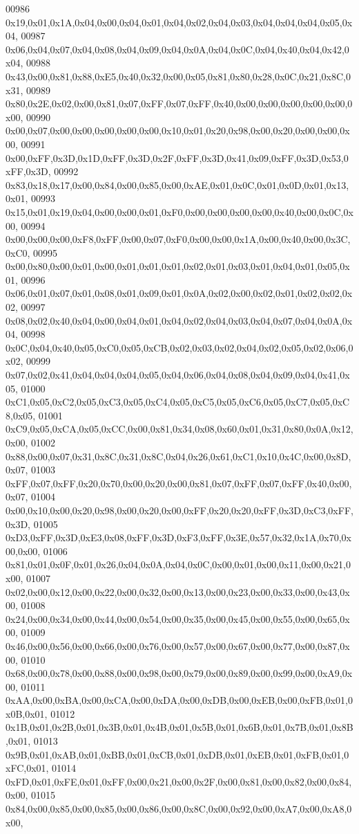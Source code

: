 \begin{DoxyCode}
00986 0x19,0x01,0x1A,0x04,0x00,0x04,0x01,0x04,0x02,0x04,0x03,0x04,0x04,0x04,0x05,0x04,
00987 0x06,0x04,0x07,0x04,0x08,0x04,0x09,0x04,0x0A,0x04,0x0C,0x04,0x40,0x04,0x42,0x04,
00988 0x43,0x00,0x81,0x88,0xE5,0x40,0x32,0x00,0x05,0x81,0x80,0x28,0x0C,0x21,0x8C,0x31,
00989 0x80,0x2E,0x02,0x00,0x81,0x07,0xFF,0x07,0xFF,0x40,0x00,0x00,0x00,0x00,0x00,0x00,
00990 0x00,0x07,0x00,0x00,0x00,0x00,0x00,0x10,0x01,0x20,0x98,0x00,0x20,0x00,0x00,0x00,
00991 0x00,0xFF,0x3D,0x1D,0xFF,0x3D,0x2F,0xFF,0x3D,0x41,0x09,0xFF,0x3D,0x53,0xFF,0x3D,
00992 0x83,0x18,0x17,0x00,0x84,0x00,0x85,0x00,0xAE,0x01,0x0C,0x01,0x0D,0x01,0x13,0x01,
00993 0x15,0x01,0x19,0x04,0x00,0x00,0x01,0xF0,0x00,0x00,0x00,0x00,0x40,0x00,0x0C,0x00,
00994 0x00,0x00,0x00,0xF8,0xFF,0x00,0x07,0xF0,0x00,0x00,0x1A,0x00,0x40,0x00,0x3C,0xC0,
00995 0x00,0x80,0x00,0x01,0x00,0x01,0x01,0x01,0x02,0x01,0x03,0x01,0x04,0x01,0x05,0x01,
00996 0x06,0x01,0x07,0x01,0x08,0x01,0x09,0x01,0x0A,0x02,0x00,0x02,0x01,0x02,0x02,0x02,
00997 0x08,0x02,0x40,0x04,0x00,0x04,0x01,0x04,0x02,0x04,0x03,0x04,0x07,0x04,0x0A,0x04,
00998 0x0C,0x04,0x40,0x05,0xC0,0x05,0xCB,0x02,0x03,0x02,0x04,0x02,0x05,0x02,0x06,0x02,
00999 0x07,0x02,0x41,0x04,0x04,0x04,0x05,0x04,0x06,0x04,0x08,0x04,0x09,0x04,0x41,0x05,
01000 0xC1,0x05,0xC2,0x05,0xC3,0x05,0xC4,0x05,0xC5,0x05,0xC6,0x05,0xC7,0x05,0xC8,0x05,
01001 0xC9,0x05,0xCA,0x05,0xCC,0x00,0x81,0x34,0x08,0x60,0x01,0x31,0x80,0x0A,0x12,0x00,
01002 0x88,0x00,0x07,0x31,0x8C,0x31,0x8C,0x04,0x26,0x61,0xC1,0x10,0x4C,0x00,0x8D,0x07,
01003 0xFF,0x07,0xFF,0x20,0x70,0x00,0x20,0x00,0x81,0x07,0xFF,0x07,0xFF,0x40,0x00,0x07,
01004 0x00,0x10,0x00,0x20,0x98,0x00,0x20,0x00,0xFF,0x20,0x20,0xFF,0x3D,0xC3,0xFF,0x3D,
01005 0xD3,0xFF,0x3D,0xE3,0x08,0xFF,0x3D,0xF3,0xFF,0x3E,0x57,0x32,0x1A,0x70,0x00,0x00,
01006 0x81,0x01,0x0F,0x01,0x26,0x04,0x0A,0x04,0x0C,0x00,0x01,0x00,0x11,0x00,0x21,0x00,
01007 0x02,0x00,0x12,0x00,0x22,0x00,0x32,0x00,0x13,0x00,0x23,0x00,0x33,0x00,0x43,0x00,
01008 0x24,0x00,0x34,0x00,0x44,0x00,0x54,0x00,0x35,0x00,0x45,0x00,0x55,0x00,0x65,0x00,
01009 0x46,0x00,0x56,0x00,0x66,0x00,0x76,0x00,0x57,0x00,0x67,0x00,0x77,0x00,0x87,0x00,
01010 0x68,0x00,0x78,0x00,0x88,0x00,0x98,0x00,0x79,0x00,0x89,0x00,0x99,0x00,0xA9,0x00,
01011 0xAA,0x00,0xBA,0x00,0xCA,0x00,0xDA,0x00,0xDB,0x00,0xEB,0x00,0xFB,0x01,0x0B,0x01,
01012 0x1B,0x01,0x2B,0x01,0x3B,0x01,0x4B,0x01,0x5B,0x01,0x6B,0x01,0x7B,0x01,0x8B,0x01,
01013 0x9B,0x01,0xAB,0x01,0xBB,0x01,0xCB,0x01,0xDB,0x01,0xEB,0x01,0xFB,0x01,0xFC,0x01,
01014 0xFD,0x01,0xFE,0x01,0xFF,0x00,0x21,0x00,0x2F,0x00,0x81,0x00,0x82,0x00,0x84,0x00,
01015 0x84,0x00,0x85,0x00,0x85,0x00,0x86,0x00,0x8C,0x00,0x92,0x00,0xA7,0x00,0xA8,0x00,

\end{DoxyCode}
